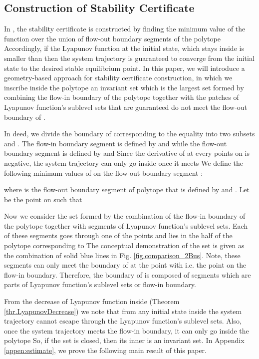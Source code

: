 \documentclass[final]{IEEEtran}
\begin{document}
\subsection{Construction of Stability Certificate}
In \cite{Vu:2014}, the stability certificate is constructed by finding the
minimum value  of the function  over the union
of flow-out boundary segments of the polytope  Accordingly, if the 
Lyapunov function at the initial state, which stays inside  is smaller than 
then the system trajectory is guaranteed to converge from the initial state to the desired stable equilibrium point.
In this paper, we will introduce a geometry-based approach for stability certificate construction,
in which we inscribe  inside the polytope  an invariant set  which is the largest set formed by combining the flow-in boundary of the polytope  together  with the patches of Lyapunov function's sublevel sets that are guaranteed do not meet the flow-out boundary of . 




In deed, we divide the
boundary  of  corresponding to the
equality  into two
subsets  and
. The flow-in boundary
segment  is defined by
 and
 while the flow-out boundary
segment  is defined by
 and
 Since the derivative of  at every points on
 is negative, the system trajectory can only go inside  once it meets 
We define the following minimum values of  on the flow-out boundary segment
:

where  is the flow-out boundary
segment of polytope  that is defined by  and .
Let  be the point on  such that
 

Now we consider the set  formed by the combination of the flow-in boundary  of the polytope 
together with  segments of Lyapunov function's sublevel sets. Each of these segments goes through one of the   points 
and lies in the half of the polytope  corresponding to  The conceptual demonstration of the set  is given as
the combination of solid blue lines
in Fig. \ref{fig.comparison_2Bus}. Note, these segments 
can only meet the boundary of  at the point with  i.e. the point on the flow-in boundary. Therefore, the boundary of  is composed of segments which are parts of Lyapunov function's sublevel sets or flow-in boundary. 

From the decrease of Lyapunov function inside  (Theorem \ref{thr.LyapunovDecrease}) we note that from any initial state inside  the system trajectory cannot escape  through the Lyapunov function's sublevel sets. Also, once the system trajectory meets the flow-in boundary, it can only go inside the polytope  So, if the set  is closed, then its inner is an invariant set.   
In Appendix \ref{appen:estimate}, we prove the following main result of this paper.
\end{document}
